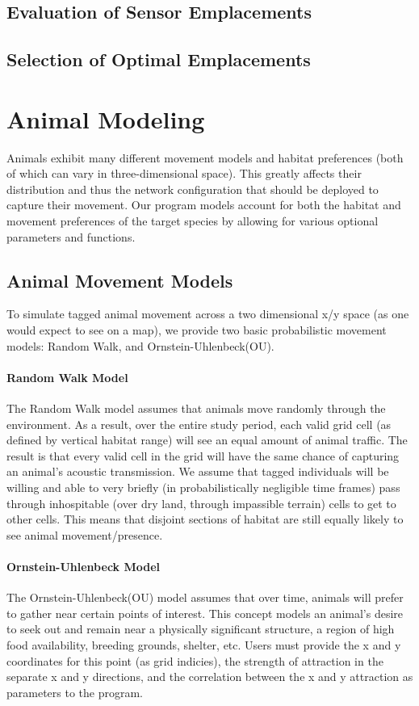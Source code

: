 \subsection{Evaluation of Sensor Emplacements}



\subsection{Selection of Optimal Emplacements}




\section{Animal Modeling}
Animals exhibit many different movement models and habitat preferences (both of which can vary in three-dimensional space).  This greatly affects their distribution and thus the network configuration that should be deployed to capture their movement.  Our program models account for both the habitat and movement preferences of the target species by allowing for various optional parameters and functions.

\subsection{Animal Movement Models}
 To simulate tagged animal movement across a two dimensional x/y space (as one would expect to see on a map), we provide two basic probabilistic movement models: Random Walk, and Ornstein-Uhlenbeck(OU).  

\paragraph{Random Walk Model}
The Random Walk model assumes that animals move randomly through the environment.  As a result, over the entire study period, each valid grid cell (as defined by vertical habitat range) will see an equal amount of animal traffic.  The result is that every valid cell  in the grid will have the same chance of capturing an animal's acoustic transmission.  We assume that tagged individuals will be willing and able to very briefly (in probabilistically negligible time frames) pass through inhospitable (over dry land, through impassible terrain) cells to get to other cells.  This means that disjoint sections of habitat are still equally likely to see animal movement/presence.

\paragraph{Ornstein-Uhlenbeck Model}
The Ornstein-Uhlenbeck(OU) model\cite{OU} assumes that over time, animals will prefer to gather near certain points of interest.  This concept models an animal's desire to seek out and remain near a physically significant structure, a region of high food availability, breeding grounds, shelter, etc.  Users must provide the x and y coordinates for this point (as grid indicies), the strength of attraction in the separate x and y directions, and the correlation between the x and y attraction as parameters to the program.  


